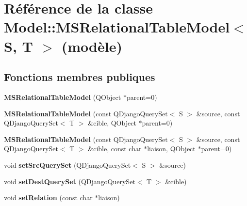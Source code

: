 \hypertarget{class_model_1_1_m_s_relational_table_model}{
\section{Référence de la classe Model::MSRelationalTableModel$<$ S, T $>$ (modèle)}
\label{dc/d52/class_model_1_1_m_s_relational_table_model}
}
\subsection*{Fonctions membres publiques}
\begin{DoxyCompactItemize}
\item 
\hypertarget{class_model_1_1_m_s_relational_table_model_a4edf02555589b8ab37b0aa8e40a9a92c}{
{\bfseries MSRelationalTableModel} (QObject $\ast$parent=0)}
\label{dc/d52/class_model_1_1_m_s_relational_table_model_a4edf02555589b8ab37b0aa8e40a9a92c}

\item 
\hypertarget{class_model_1_1_m_s_relational_table_model_a64c0a17b9dfd48271cd0c4935c999a74}{
{\bfseries MSRelationalTableModel} (const QDjangoQuerySet$<$ S $>$ \&source, const QDjangoQuerySet$<$ T $>$ \&cible, QObject $\ast$parent=0)}
\label{dc/d52/class_model_1_1_m_s_relational_table_model_a64c0a17b9dfd48271cd0c4935c999a74}

\item 
\hypertarget{class_model_1_1_m_s_relational_table_model_ac8ff373f4ade27feb5983132705082b7}{
{\bfseries MSRelationalTableModel} (const QDjangoQuerySet$<$ S $>$ \&source, const QDjangoQuerySet$<$ T $>$ \&cible, const char $\ast$liaison, QObject $\ast$parent=0)}
\label{dc/d52/class_model_1_1_m_s_relational_table_model_ac8ff373f4ade27feb5983132705082b7}

\item 
\hypertarget{class_model_1_1_m_s_relational_table_model_a62f7a5c786ba2c13c7bf5769243d0526}{
void {\bfseries setSrcQuerySet} (QDjangoQuerySet$<$ S $>$ \&source)}
\label{dc/d52/class_model_1_1_m_s_relational_table_model_a62f7a5c786ba2c13c7bf5769243d0526}

\item 
\hypertarget{class_model_1_1_m_s_relational_table_model_a5cb2019d998ae621124417af3825404d}{
void {\bfseries setDestQuerySet} (QDjangoQuerySet$<$ T $>$ \&cible)}
\label{dc/d52/class_model_1_1_m_s_relational_table_model_a5cb2019d998ae621124417af3825404d}

\item 
\hypertarget{class_model_1_1_m_s_relational_table_model_a4bef4ba16a9f5259dc57f0abb044adf2}{
void {\bfseries setRelation} (const char $\ast$liaison)}
\label{dc/d52/class_model_1_1_m_s_relational_table_model_a4bef4ba16a9f5259dc57f0abb044adf2}


\end{DoxyCompactItemize}

